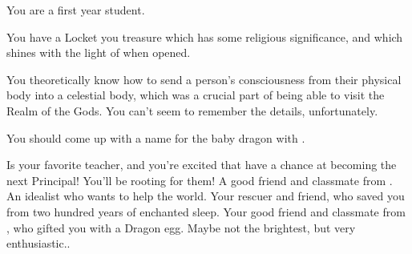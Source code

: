 \documentclass[char]{GL2020}
\begin{document}
\begin{itemz}[Notes]
	\item You are a first year student.
	\item You have a Locket you treasure which has some religious significance, and which shines with the light of \cFarmGod{} when opened.
	\item You theoretically know how to send a person’s consciousness from their physical body into a celestial body, which was a crucial part of being able to visit the Realm of the Gods.  You can’t seem to remember the details, unfortunately.
	\item You should come up with a name for the baby dragon with \cPirateChild{}.
\end{itemz}

\begin{contacts}
	\contact{\cMusic{}} Is your favorite teacher, and you’re excited that \cMusic{\they} have a chance at becoming the next Principal!  You’ll be rooting for them! 
	\contact{\cTechStar{}} A good friend and classmate from \pTech{}. An idealist who wants to help the world.
	\contact{\cWildCard{}} Your rescuer and friend, who saved you from two hundred years of enchanted sleep.
	\contact{\cPirateChild{}} Your good friend and classmate from \pShip{}, who gifted you with a Dragon egg. Maybe not the brightest, but very enthusiastic..
	
\end{contacts}
\end{document}
